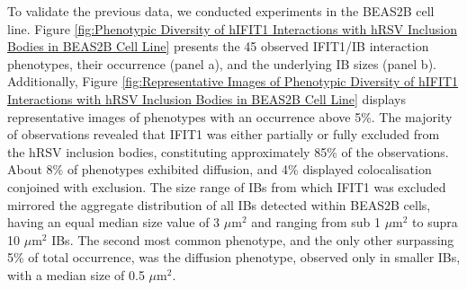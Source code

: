 To validate the previous data, we conducted experiments in the BEAS2B cell line. Figure \ref{fig:Phenotypic Diversity of hIFIT1 Interactions with hRSV Inclusion Bodies in BEAS2B Cell Line} presents the 45 observed IFIT1/IB interaction phenotypes, their occurrence (panel a), and the underlying IB sizes (panel b). Additionally, Figure \ref{fig:Representative Images of Phenotypic Diversity of hIFIT1 Interactions with hRSV Inclusion Bodies in BEAS2B Cell Line} displays representative images of phenotypes with an occurrence above 5\%. The majority of observations revealed that IFIT1 was either partially or fully excluded from the hRSV inclusion bodies, constituting approximately 85\% of the observations. About 8\% of phenotypes exhibited diffusion, and 4\% displayed colocalisation conjoined with exclusion. The size range of IBs from which IFIT1 was excluded mirrored the aggregate distribution of all IBs detected within BEAS2B cells, having an equal median size value of 3 \(\mu \mbox{m}^2\) and ranging from sub 1 \(\mu \mbox{m}^2\) to supra 10 \(\mu \mbox{m}^2\) IBs. The second most common phenotype, and the only other surpassing 5\% of total occurrence, was the diffusion phenotype, observed only in smaller IBs, with a median size of 0.5 \(\mu \mbox{m}^2\).

